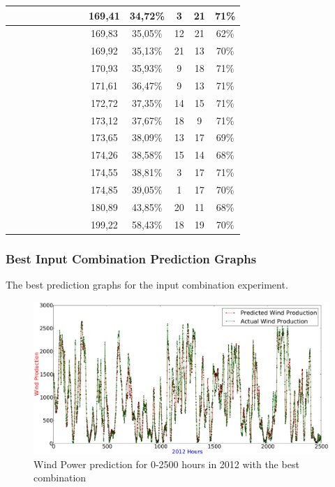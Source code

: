 \begin{center}
\begin{longtable}{|c|c|c|c|c|c|c|c|c|c|c|c|c|}
 \x &  \x &  \x &  &  \x &  \x &  \x &  \x & 169,41 & 34,72\% & 3 & 21 & 71\% \\ \hline
 \x &  \x &  \x &  \x &  \x &  &  \x &  \x & 169,83 & 35,05\% & 12 & 21 & 62\% \\ \hline
 \x &  &  &  \x &  \x &  \x &  \x &  \x & 169,92 & 35,13\% & 21 & 13 & 70\% \\ \hline
 \x &  \x &  &  \x &  &  \x &  \x &  \x & 170,93 & 35,93\% & 9 & 18 & 71\% \\ \hline
 \x &  &  \x &  \x &  \x &  \x &  \x &  \x & 171,61 & 36,47\% & 9 & 13 & 71\% \\ \hline
 \x &  &  \x &  \x &  &  \x &  \x &  \x & 172,72 & 37,35\% & 14 & 15 & 71\% \\ \hline
 \x &  &  &  &  \x &  \x &  \x &  \x & 173,12 & 37,67\% & 18 & 9 & 71\% \\ \hline
 \x &  &  \x &  \x &  &  \x &  \x &  \x & 173,65 & 38,09\% & 13 & 17 & 69\% \\ \hline
 \x &  \x &  \x &  \x &  \x &  \x &  \x &  \x & 174,26 & 38,58\% & 15 & 14 & 68\% \\ \hline
 \x &  \x &  &  \x &  &  \x &  \x &  \x & 174,55 & 38,81\% & 3 & 17 & 71\% \\ \hline
 \x &  &  &  \x &  &  \x &  \x &  \x & 174,85 & 39,05\% & 1 & 17 & 70\% \\ \hline
 \x &  \x &  \x &  &  \x &  \x &  \x &  \x & 180,89 & 43,85\% & 20 & 11 & 68\% \\ \hline
 \x &  \x &  &  &  \x &  \x &  \x &  \x & 199,22 & 58,43\% & 18 & 19 & 70\% \\ \hline
\end{longtable}
\label{table:windProdInputParams}
\end{center}
\normalsize

\subsubsection{Best Input Combination Prediction Graphs}
\label{sec:bestCombiPredictionsGraphs}
The best prediction graphs for the input combination experiment.

\begin{figure}
\centering
\includegraphics[width=0.99\linewidth]{billeder/bestInputCombi0-2500.png}
\caption{Wind Power prediction for 0-2500 hours in 2012 with the best combination}
\label{fig:bestInputCombi0-2500}
\end{figure} 

